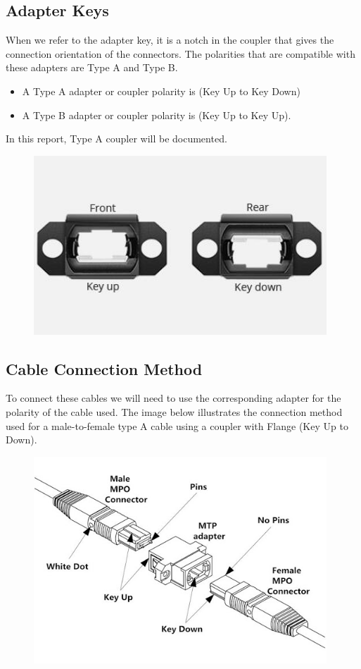 \newpage

  \subsection{Adapter Keys}
  When we refer to the adapter key, it is a notch in the coupler that gives the connection orientation of the connectors. The polarities that are compatible with these adapters are Type A and Type B.
  \begin{itemize}
    \item A Type A adapter or coupler polarity is (Key Up to Key Down)
    \item A Type B adapter or coupler polarity is  (Key Up to Key Up).
  \end{itemize}
  In this report, Type A coupler will be documented.
  \begin{figure}
    \includegraphics[width=11cm]{images/8.jpg}
    \centering
  \end{figure}

\newpage

  \subsection{Cable Connection Method}
  To connect these cables we will need to use the corresponding adapter for the polarity of the cable used. The image below illustrates the connection method used for a male-to-female type A cable using a coupler with Flange (Key Up to Down).
  \begin{figure}
    \includegraphics[width=11cm]{images/9.jpg}
    \centering
  \end{figure}

